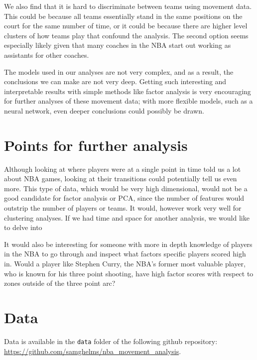 \documentclass[]{article}
\begin{document}
We also find that it is hard to discriminate between teams using
movement data. This could be because all teams essentially stand in the
same positions on the court for the same number of time, or it could be
because there are higher level clusters of how teams play that confound
the analysis. The second option seems especially likely given that many
coaches in the NBA start out working as assistants for other coaches.

The models used in our analyses are not very complex, and as a result,
the conclusions we can make are not very deep. Getting such interesting
and interpretable results with simple methods like factor analysis is
very encouraging for further analyses of these movement data; with more
flexible models, such as a neural network, even deeper conclusions could
possibly be drawn.

\hypertarget{points-for-further-analysis}{%
\section{Points for further
analysis}\label{points-for-further-analysis}}

Although looking at where players were at a single point in time told us
a lot about NBA games, looking at their transitions could potentially
tell us even more. This type of data, which would be very high
dimensional, would not be a good candidate for factor analysis or PCA,
since the number of features would outstrip the number of players or
teams. It would, however work very well for clustering analyses. If we
had time and space for another analysis, we would like to delve into

It would also be interesting for someone with more in depth knowledge of
players in the NBA to go through and inspect what factors specific
players scored high in. Would a player like Stephen Curry, the NBA's
former most valuable player, who is known for his three point shooting,
have high factor scores with respect to zones outside of the three point
arc?

\hypertarget{data-1}{%
\section{Data}\label{data-1}}

Data is available in the \texttt{data} folder of the following github
repository: \url{https://github.com/samghelms/nba_movement_analysis}.
\end{document}
